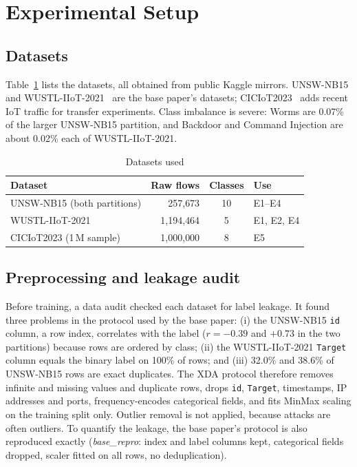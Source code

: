 \documentclass[conference]{IEEEtran}
\begin{document}
\section{Experimental Setup}\label{sec:setup}
\subsection{Datasets}
Table~\ref{tab:data} lists the datasets, all obtained from public Kaggle mirrors. UNSW-NB15 and WUSTL-IIoT-2021~\cite{zolanvari2021} are the base paper's datasets; CICIoT2023~\cite{neto2023} adds recent IoT traffic for transfer experiments. Class imbalance is severe: Worms are 0.07\% of the larger UNSW-NB15 partition, and Backdoor and Command Injection are about 0.02\% each of WUSTL-IIoT-2021.

\begin{table}[t]
\caption{Datasets used}
\label{tab:data}
\centering\footnotesize
\begin{tabular}{@{}lrcl@{}}
\toprule
Dataset & Raw flows & Classes & Use \\
\midrule
UNSW-NB15 (both partitions) & 257{,}673 & 10 & E1--E4 \\
WUSTL-IIoT-2021 & 1{,}194{,}464 & 5 & E1, E2, E4 \\
CICIoT2023 (1\,M sample) & 1{,}000{,}000 & 8 & E5 \\
\bottomrule
\end{tabular}
\end{table}

\subsection{Preprocessing and leakage audit}
Before training, a data audit checked each dataset for label leakage. It found three problems in the protocol used by the base paper: (i) the UNSW-NB15 \texttt{id} column, a row index, correlates with the label ($r=-0.39$ and $+0.73$ in the two partitions) because rows are ordered by class; (ii) the WUSTL-IIoT-2021 \texttt{Target} column equals the binary label on 100\% of rows; and (iii) 32.0\% and 38.6\% of UNSW-NB15 rows are exact duplicates. The XDA protocol therefore removes infinite and missing values and duplicate rows, drops \texttt{id}, \texttt{Target}, timestamps, IP addresses and ports, frequency-encodes categorical fields, and fits MinMax scaling on the training split only. Outlier removal is not applied, because attacks are often outliers. To quantify the leakage, the base paper's protocol is also reproduced exactly (\textit{base\_repro}: index and label columns kept, categorical fields dropped, scaler fitted on all rows, no deduplication).
\end{document}
